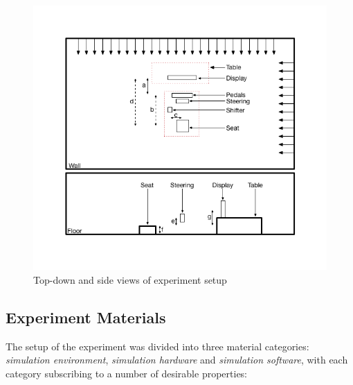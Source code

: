 \begin{figure}
	\centering
	\includegraphics[width=\textwidth]{images/experiment-setup-schematic.png}
	\caption[Experiment Setup Schematic]{Top-down and side views of experiment setup}
	\label{fig:meth-experiment-setup}
\end{figure}

\subsection{Experiment Materials}
\label{sec:meth-experiment-setup}
The setup of the experiment was divided into three material categories: \emph{simulation environment}, \emph{simulation hardware} and \emph{simulation software}, with each category subscribing to a number of desirable properties: 

